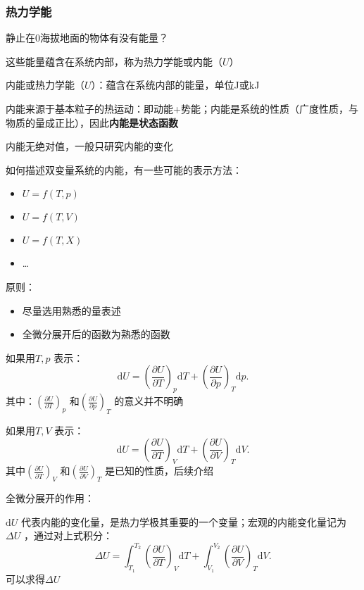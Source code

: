 \subsubsection*{热力学能}%
\label{subsub:热力学能}
\begin{question}
    静止在0海拔地面的物体有没有能量？
\end{question}
这些能量蕴含在系统内部，称为热力学能或内能（$U$）
\begin{defi}
    内能或热力学能（$U$）：蕴含在系统内部的能量，单位J或kJ
\end{defi}
内能来源于基本粒子的热运动：即动能+势能；内能是系统的性质（广度性质，与物质的量成正比），因此\textbf{内能是状态函数}
\begin{notation}
    内能无绝对值，一般只研究内能的变化
\end{notation}
如何描述双变量系统的内能，有一些可能的表示方法：
\begin{itemize}
    \item $U=f\left( T,p \right)$
    \item $U=f\left( T,V \right)$
    \item $U=f\left( T,X \right)$
    \item \ldots 
    
\end{itemize}
原则：
\begin{itemize}
    \item 尽量选用熟悉的量表述
    \item 全微分展开后的函数为熟悉的函数
    
\end{itemize}
\begin{eg}
    如果用$T,p$ 表示： \[
        \mathrm{d}U=\left(\frac{\partial U}{\partial T}\right)_{p}\mathrm{d}T + \left(\frac{\partial U}{\partial p}\right)_{T}\mathrm{d}p
    .\]
    其中：$\left(\frac{\partial U}{\partial T}\right)_{p}$ 和$\left(\frac{\partial U}{\partial p}\right)_{T}$ 的意义并不明确

    如果用$T,V$ 表示：
    \[
        \mathrm{d}U = \left(\frac{\partial U}{\partial T}\right)_{V}\mathrm{d}T + \left(\frac{\partial U}{\partial V}\right)_{T}\mathrm{d}V
    .\]
    其中$\left(\frac{\partial U}{\partial T}\right)_{V}$ 和$\left(\frac{\partial U}{\partial V}\right)_{T}$ 是已知的性质，后续介绍
\end{eg}
全微分展开的作用：
\begin{eg}
$\mathrm{d}U$ 代表内能的变化量，是热力学极其重要的一个变量；宏观的内能变化量记为$\Delta U$ ，通过对上式积分：\[
    \Delta U = \int_{T_1}^{T_2} \left(\frac{\partial U}{\partial T}\right)_{V} \mathrm{d}T + \int_{V_1}^{V_2} \left(\frac{\partial U}{\partial V}\right)_{T} \mathrm{d}V
.\]
可以求得$\Delta U$
\end{eg}
